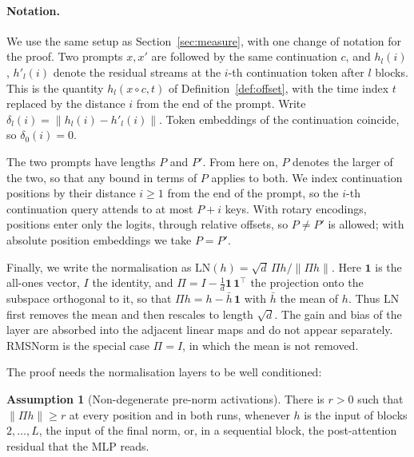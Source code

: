 \documentclass[11pt]{article}
\theoremstyle{definition}
\newtheorem{assumption}{Assumption}
\theoremstyle{remark}
\begin{document}
\paragraph{Notation.} We use the same setup as Section~\ref{sec:measure}, with one change of notation for the proof. Two prompts $x,x'$ are followed by the same continuation $c$, and $h_l(i)$, $h'_l(i)$ denote the residual streams at the $i$-th continuation token after $l$ blocks. This is the quantity $h_l(x\circ c,t)$ of Definition~\ref{def:offset}, with the time index $t$ replaced by the distance $i$ from the end of the prompt. Write $\delta_l(i)=\|h_l(i)-h'_l(i)\|$. Token embeddings of the continuation coincide, so $\delta_0(i)=0$.

The two prompts have lengths $P$ and $P'$. From here on, $P$ denotes the larger of the two, so that any bound in terms of $P$ applies to both. We index continuation positions by their distance $i\ge1$ from the end of the prompt, so the $i$-th continuation query attends to at most $P+i$ keys. With rotary encodings, positions enter only the logits, through relative offsets, so $P\neq P'$ is allowed; with absolute position embeddings we take $P=P'$.

Finally, we write the normalisation as $\mathrm{LN}(h)=\sqrt d\,\Pi h/\|\Pi h\|$. Here $\mathbf 1$ is the all-ones vector, $I$ the identity, and $\Pi=I-\tfrac1d\mathbf 1\,\mathbf 1^\top$ the projection onto the subspace orthogonal to it, so that $\Pi h=h-\bar h\,\mathbf 1$ with $\bar h$ the mean of $h$. Thus $\mathrm{LN}$ first removes the mean and then rescales to length $\sqrt d$. The gain and bias of the layer are absorbed into the adjacent linear maps and do not appear separately. RMSNorm is the special case $\Pi=I$, in which the mean is not removed.

The proof needs the normalisation layers to be well conditioned:

\begin{assumption}[Non-degenerate pre-norm activations]\label{ass:nondeg}
There is $r>0$ such that $\|\Pi h\|\ge r$ at every position and in both runs, whenever $h$ is the input of blocks $2,\dots,L$, the input of the final norm, or, in a sequential block, the post-attention residual that the MLP reads.
\end{assumption}
\end{document}
